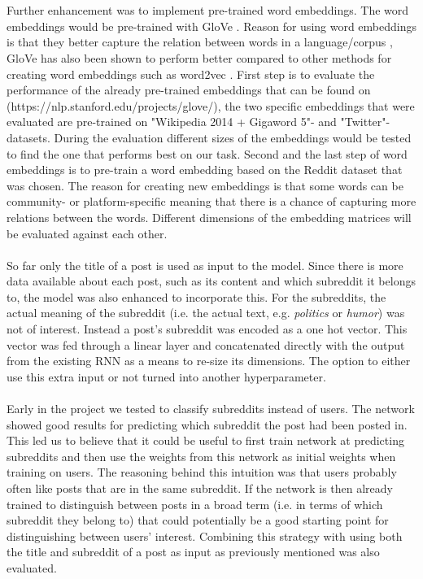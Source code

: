 \\\\
Further enhancement was to implement pre-trained word embeddings. The word embeddings would be pre-trained with GloVe \parencite{pennington2014glove}. Reason for using word embeddings is that they better capture the relation between words in a language/corpus \parencite{mikolov2013linguistic}, GloVe has also been shown to perform better compared to other methods for creating word embeddings such as word2vec \parencite{pennington2014glove}. First step is to evaluate the performance of the already pre-trained embeddings that can be found on (https://nlp.stanford.edu/projects/glove/), the two specific embeddings that were evaluated are pre-trained on "Wikipedia 2014 + Gigaword 5"- and "Twitter"-datasets. During the evaluation different sizes of the embeddings would be tested to find the one that performs best on our task. Second and the last step of word embeddings is to pre-train a word embedding based on the Reddit dataset that was chosen. 
The reason for creating new embeddings is that some words can be community- or platform-specific meaning that there is a chance of capturing more relations between the words. Different dimensions of the embedding matrices will be evaluated against each other. 
\\\\
So far only the title of a post is used as input to the model. Since there is more data available about each post, such as its content and which subreddit it belongs to, the model was also enhanced to incorporate this. For the subreddits, the actual meaning of the subreddit (i.e. the actual text, e.g. \textit{politics} or \textit{humor}) was not of interest. Instead a post's subreddit was encoded as a one hot vector. This vector was fed through a linear layer and concatenated directly with the output from the existing RNN as a means to re-size its dimensions. The option to either use this extra input or not turned into another hyperparameter.
\\\\
Early in the project we tested to classify subreddits instead of users. The network showed good results for predicting which subreddit the post had been posted in. This led us to believe that it could be useful to first train network at predicting subreddits and then use the weights from this network as initial weights when training on users. The reasoning behind this intuition was that users probably often like posts that are in the same subreddit. If the network is then already trained to distinguish between posts in a broad term (i.e. in terms of which subreddit they belong to) that could potentially be a good starting point for distinguishing between users' interest. Combining this strategy with using both the title and subreddit of a post as input as previously mentioned was also evaluated.

